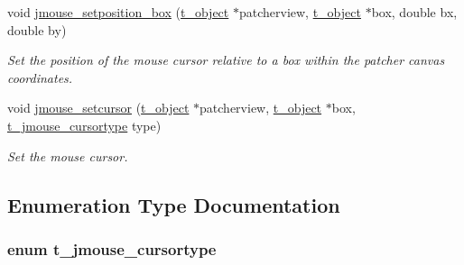 \begin{DoxyCompactItemize}
void \hyperlink{group__jmouse_ga8d209aa8fadfbe4d5038b2041eae801e}{jmouse\_\-setposition\_\-box} (\hyperlink{structt__object}{t\_\-object} $\ast$patcherview, \hyperlink{structt__object}{t\_\-object} $\ast$box, double bx, double by)
\begin{DoxyCompactList}\small\item\em Set the position of the mouse cursor relative to a box within the patcher canvas coordinates. \item\end{DoxyCompactList}\item 
void \hyperlink{group__jmouse_gaf8bd554aa25bb4ccd3945a227876fe47}{jmouse\_\-setcursor} (\hyperlink{structt__object}{t\_\-object} $\ast$patcherview, \hyperlink{structt__object}{t\_\-object} $\ast$box, \hyperlink{group__jmouse_ga4d6e7dd3d4d260c28f3bce9b9f36f764}{t\_\-jmouse\_\-cursortype} type)
\begin{DoxyCompactList}\small\item\em Set the mouse cursor. \item\end{DoxyCompactList}\end{DoxyCompactItemize}


\subsection{Enumeration Type Documentation}
\hypertarget{group__jmouse_ga4d6e7dd3d4d260c28f3bce9b9f36f764}{
\subsubsection[{t\_\-jmouse\_\-cursortype}]{\setlength{\rightskip}{0pt plus 5cm}enum {\bf t\_\-jmouse\_\-cursortype}}}
\label{group__jmouse_ga4d6e7dd3d4d260c28f3bce9b9f36f764}


